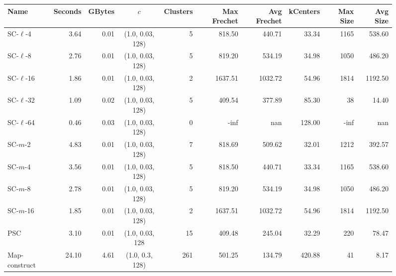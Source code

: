 \begin{figure}[h]
\begin{center}
\begin{minipage}{\textwidth}
    {
    \begin{tabular}{@{}lrrcrrrrrr@{}}
        \toprule
        Name & Seconds & GBytes & $c$ & Clusters & Max Frechet & Avg Frechet & kCenters & Max Size & Avg Size\\
        \midrule
        SC-$\ell$-4 & 3.64 & 0.01 & (1.0, 0.03, 128) & 5 & 818.50 & 440.71 & 33.34 & 1165 & 538.60\\
        SC-$\ell$-8 & 2.76 & 0.01 & (1.0, 0.03, 128) & 5 & 819.20 & 534.19 & 34.98 & 1050 & 486.20\\
        SC-$\ell$-16 & 1.86 & 0.01 & (1.0, 0.03, 128) & 2 & 1637.51 & 1032.72 & 54.96 & 1814 & 1192.50\\
        SC-$\ell$-32 & 1.09 & 0.02 & (1.0, 0.03, 128) & 5 & 409.54 & 377.89 & 85.30 & 38 & 14.40\\
        SC-$\ell$-64 & 0.46 & 0.03 & (1.0, 0.03, 128) & 0 & -inf & nan & 128.00 & -inf & nan\\
        SC-$m$-2 & 4.83 & 0.01 & (1.0, 0.03, 128) & 7 & 818.69 & 509.62 & 32.01 & 1212 & 392.57\\
        SC-$m$-4 & 3.56 & 0.01 & (1.0, 0.03, 128) & 5 & 818.50 & 440.71 & 33.34 & 1165 & 538.60\\
        SC-$m$-8 & 2.78 & 0.01 & (1.0, 0.03, 128) & 5 & 819.20 & 534.19 & 34.98 & 1050 & 486.20\\
        SC-$m$-16 & 1.85 & 0.01 & (1.0, 0.03, 128) & 2 & 1637.51 & 1032.72 & 54.96 & 1814 & 1192.50\\
        PSC & 3.10 & 0.01 & (1.0, 0.03, 128 & 15 & 409.48 & 245.04 & 32.29 & 220 & 78.47\\
        Map-construct & 24.10 & 4.61 & (1.0, 0.3, 128) & 261 & 501.25 & 134.79 & 420.88 & 41 & 8.17\\
        \bottomrule
    \end{tabular}}


\end{minipage}
\end{center}
\end{figure}

